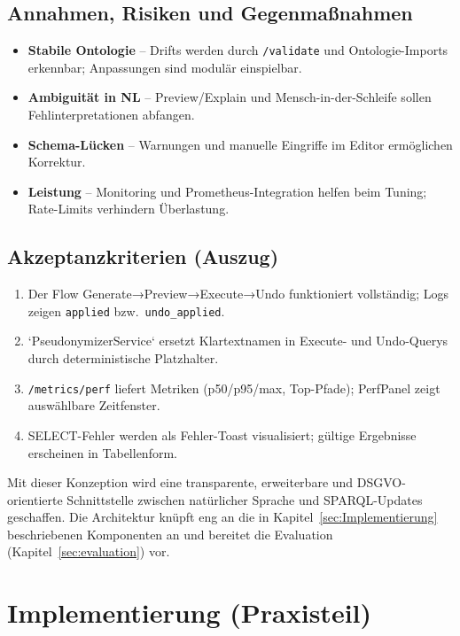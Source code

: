 \section{Annahmen, Risiken und Gegenmaßnahmen}
\begin{itemize}
  \item \textbf{Stabile Ontologie} – Drifts werden durch \texttt{/validate} und Ontologie-Imports erkennbar; Anpassungen sind modulär einspielbar.
  \item \textbf{Ambiguität in NL} – Preview/Explain und Mensch-in-der-Schleife sollen Fehlinterpretationen abfangen.
  \item \textbf{Schema-Lücken} – Warnungen und manuelle Eingriffe im Editor ermöglichen Korrektur.
  \item \textbf{Leistung} – Monitoring und Prometheus-Integration helfen beim Tuning; Rate-Limits verhindern Überlastung.
\end{itemize}

\section{Akzeptanzkriterien (Auszug)}
\begin{enumerate}
  \item Der Flow Generate→Preview→Execute→Undo funktioniert vollständig; Logs zeigen \texttt{applied} bzw.\ \texttt{undo\_applied}.
  \item `PseudonymizerService` ersetzt Klartextnamen in Execute- und Undo-Querys durch deterministische Platzhalter.
  \item \texttt{/metrics/perf} liefert Metriken (p50/p95/max, Top-Pfade); PerfPanel zeigt auswählbare Zeitfenster.
  \item SELECT-Fehler werden als Fehler-Toast visualisiert; gültige Ergebnisse erscheinen in Tabellenform.
\end{enumerate}

\medskip
Mit dieser Konzeption wird eine transparente, erweiterbare und DSGVO-orientierte Schnittstelle zwischen natürlicher Sprache und SPARQL-Updates geschaffen. Die Architektur knüpft eng an die in Kapitel~\ref{sec:Implementierung} beschriebenen Komponenten an und bereitet die Evaluation (Kapitel~\ref{sec:evaluation}) vor.





\chapter{Implementierung (Praxisteil)}
\label{sec:implementierung}

